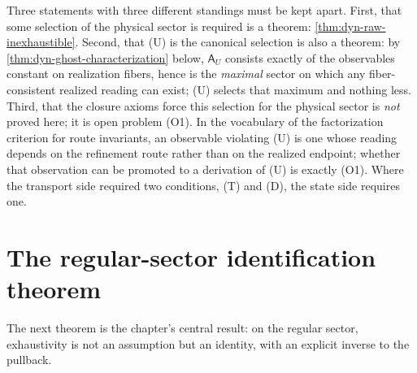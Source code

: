 \begin{remark}
	\label{rem:dyn-U-status}
	Three statements with three different standings must be kept
	apart. First, that some selection of the physical sector is
	required is a theorem: \cref{thm:dyn-raw-inexhaustible}. Second,
	that \textup{(U)} is the canonical selection is also a theorem:
	by \cref{thm:dyn-ghost-characterization} below, \(\mathsf A_U\)
	consists exactly of the observables constant on realization
	fibers, hence is the \emph{maximal} sector on which any
	fiber-consistent realized reading can exist; \textup{(U)} selects
	that maximum and nothing less. Third, that the closure axioms
	force this selection for the physical sector is \emph{not} proved
	here; it is open problem \textup{(O1)}. In the vocabulary of the
	factorization criterion for route invariants, an observable
	violating \textup{(U)} is one whose reading depends on the
	refinement route rather than on the realized endpoint; whether
	that observation can be promoted to a derivation of \textup{(U)}
	is exactly \textup{(O1)}. Where the transport side required two
	conditions, \textup{(T)} and \textup{(D)}, the state side requires
	one.
\end{remark}

\section{The regular-sector identification theorem}
\label{sec:dyn-identification}
The next theorem is the chapter's central result: on the regular
sector, exhaustivity is not an assumption but an identity, with an
explicit inverse to the pullback.

